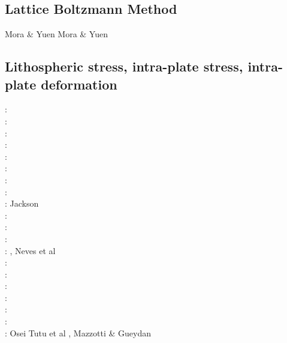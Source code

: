 \subsection{Lattice Boltzmann Method}

Mora \& Yuen \cite{moyu17}
Mora \& Yuen \cite{moyu18}


\subsection{Lithospheric stress, intra-plate stress, intra-plate deformation}

\begin{scriptsize}
\nineteenseventyfive: \cite{fouy75}\cite{sosr75}\\
\nineteenseventysix: \cite{riss76}\\
\nineteenseventyseven: \cite{chtu77}\\
\nineteenseventynine: \cite{riss79}\\
\nineteeneightynine: \cite{boww89}\\
\nineteenninetyone: \cite{worg91}\\
\nineteenninetytwo: \cite{rich92}\cite{wuvr92}\cite{zoba92}\cite{clko92}\\
\twothousandone: \cite{stsm01}\\
\twothousandtwo: Jackson \cite{jack02}\\
\twothousandfour: \cite{ligu04}\\
\twothousandfive: \cite{timr05}\\
\twothousandseven: \cite{hert07}\\
\twothousandeight: \cite{bilr08}\cite{ghhw08}, Neves et al \cite{netv08}\\
\twothousandnine: \cite{ghhf09}\cite{nacl09}\\
\twothousandten: \cite{bepo10}\cite{yosh10}\\
\twothousandtwelve: \cite{nalr12}\cite{ghho12}\cite{wagw12}\\
\twothousandthirteen: \cite{ghhw13}\cite{wagw13}\\
\twothousandfourteen: \cite{vagw14}\\
\twothousandseventeen: \cite{grrb17}\\
\twothousandeighteen: Osei Tutu et al \cite{osss18}, Mazzotti \& Gueydan \cite{magu18}
\end{scriptsize}


